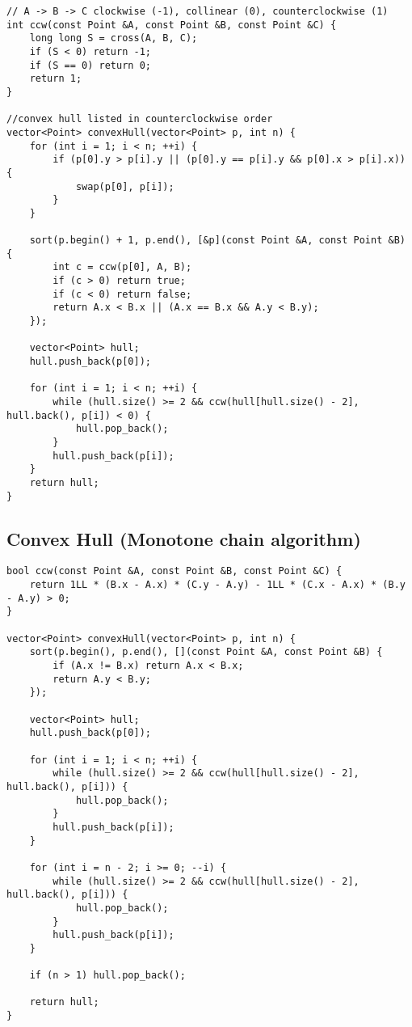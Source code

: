 \documentclass[11pt,a4paper]{article}
\begin{document}
\begin{multicols*}{2}
\begin{lstlisting}
// A -> B -> C clockwise (-1), collinear (0), counterclockwise (1)
int ccw(const Point &A, const Point &B, const Point &C) {
    long long S = cross(A, B, C);
    if (S < 0) return -1;
    if (S == 0) return 0;
    return 1;
}

//convex hull listed in counterclockwise order
vector<Point> convexHull(vector<Point> p, int n) {
    for (int i = 1; i < n; ++i) {
        if (p[0].y > p[i].y || (p[0].y == p[i].y && p[0].x > p[i].x)) {
            swap(p[0], p[i]);
        }
    }

    sort(p.begin() + 1, p.end(), [&p](const Point &A, const Point &B) {
        int c = ccw(p[0], A, B);
        if (c > 0) return true;
        if (c < 0) return false;
        return A.x < B.x || (A.x == B.x && A.y < B.y);
    });

    vector<Point> hull;
    hull.push_back(p[0]);

    for (int i = 1; i < n; ++i) {
        while (hull.size() >= 2 && ccw(hull[hull.size() - 2], hull.back(), p[i]) < 0) {
            hull.pop_back();
        }
        hull.push_back(p[i]);
    }
    return hull;
}
\end{lstlisting}

\subsection{Convex Hull (Monotone chain algorithm)}
\begin{lstlisting}
bool ccw(const Point &A, const Point &B, const Point &C) {
    return 1LL * (B.x - A.x) * (C.y - A.y) - 1LL * (C.x - A.x) * (B.y - A.y) > 0;
}

vector<Point> convexHull(vector<Point> p, int n) {
    sort(p.begin(), p.end(), [](const Point &A, const Point &B) {
        if (A.x != B.x) return A.x < B.x;
        return A.y < B.y;
    });

    vector<Point> hull;
    hull.push_back(p[0]);

    for (int i = 1; i < n; ++i) {
        while (hull.size() >= 2 && ccw(hull[hull.size() - 2], hull.back(), p[i])) {
            hull.pop_back();
        }
        hull.push_back(p[i]);
    }

    for (int i = n - 2; i >= 0; --i) {
        while (hull.size() >= 2 && ccw(hull[hull.size() - 2], hull.back(), p[i])) {
            hull.pop_back();
        }
        hull.push_back(p[i]);
    }

    if (n > 1) hull.pop_back();

    return hull;
}
\end{lstlisting}


\end{multicols*}
\end{document}
